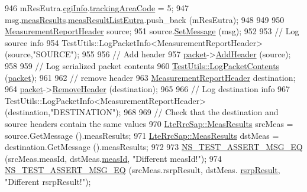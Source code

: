 \begin{DoxyCode}
946   mResEutra.\hyperlink{structns3_1_1LteRrcSap_1_1MeasResultEutra_a9ce8dff958c28eec9f3ae71c6d54f6bb}{cgiInfo}.\hyperlink{structns3_1_1LteRrcSap_1_1CgiInfo_ab6037522e5ef68de7132f0f5732cc190}{trackingAreaCode} = 5;
947   msg.\hyperlink{structns3_1_1LteRrcSap_1_1MeasurementReport_a84a65ffec25d719fdcba03fb28ca5b86}{measResults}.\hyperlink{structns3_1_1LteRrcSap_1_1MeasResults_a1fc2cdef154508dd522b46c71f854f03}{measResultListEutra}.push\_back (mResEutra);
948 
949 
950   \hyperlink{classns3_1_1MeasurementReportHeader}{MeasurementReportHeader} source;
951   source.\hyperlink{classns3_1_1MeasurementReportHeader_adf03e2e58b351602d7f72fa19a786be1}{SetMessage} (msg);
952 
953   \textcolor{comment}{// Log source info}
954   TestUtils::LogPacketInfo<MeasurementReportHeader> (source,\textcolor{stringliteral}{"SOURCE"});
955 
956   \textcolor{comment}{// Add header}
957   \hyperlink{classRrcHeaderTestCase_a6f0748c0e845f797497fbda1ca781803}{packet}->\hyperlink{classns3_1_1Packet_a465108c595a0bc592095cbcab1832ed8}{AddHeader} (source);
958 
959   \textcolor{comment}{// Log serialized packet contents}
960   \hyperlink{classTestUtils_a9391dac3282094e6e57c0052d88a086f}{TestUtils::LogPacketContents} (\hyperlink{classRrcHeaderTestCase_a6f0748c0e845f797497fbda1ca781803}{packet});
961 
962   \textcolor{comment}{// remove header}
963   \hyperlink{classns3_1_1MeasurementReportHeader}{MeasurementReportHeader} destination;
964   \hyperlink{classRrcHeaderTestCase_a6f0748c0e845f797497fbda1ca781803}{packet}->\hyperlink{classns3_1_1Packet_a0961eccf975d75f902d40956c93ba63e}{RemoveHeader} (destination);
965 
966   \textcolor{comment}{// Log destination info}
967   TestUtils::LogPacketInfo<MeasurementReportHeader> (destination,\textcolor{stringliteral}{"DESTINATION"});
968 
969   \textcolor{comment}{// Check that the destination and source headers contain the same values}
970   \hyperlink{structns3_1_1LteRrcSap_1_1MeasResults}{LteRrcSap::MeasResults} srcMeas = source.GetMessage ().measResults;
971   \hyperlink{structns3_1_1LteRrcSap_1_1MeasResults}{LteRrcSap::MeasResults} dstMeas = destination.GetMessage ().measResults;
972 
973   \hyperlink{group__testing_ga2a9d78cffb3db8e867c35fff0b698cf5}{NS\_TEST\_ASSERT\_MSG\_EQ} (srcMeas.measId, dstMeas.\hyperlink{structns3_1_1LteRrcSap_1_1MeasResults_a1608bbea7e59da137c1b58d3bf55e907}{measId}, \textcolor{stringliteral}{"Different measId!"});
974   \hyperlink{group__testing_ga2a9d78cffb3db8e867c35fff0b698cf5}{NS\_TEST\_ASSERT\_MSG\_EQ} (srcMeas.rsrpResult, dstMeas.
      \hyperlink{structns3_1_1LteRrcSap_1_1MeasResults_a4d7bf8765525493fe5f5cccdbf94ab8b}{rsrpResult}, \textcolor{stringliteral}{"Different rsrpResult!"});

\end{DoxyCode}
